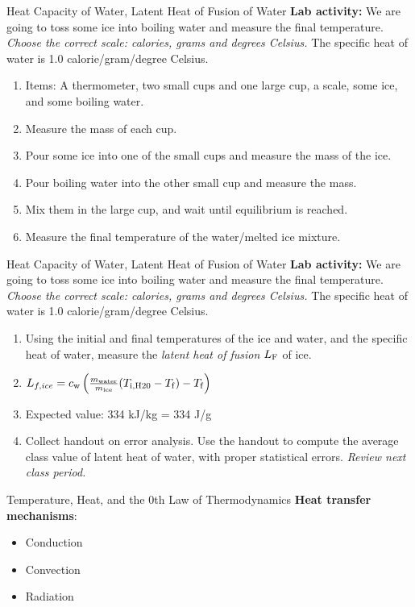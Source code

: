 \documentclass{beamer}
\begin{document}
\begin{frame}{Heat Capacity of Water, Latent Heat of Fusion of Water}
\small
\textbf{Lab activity:} We are going to toss some ice into boiling water and measure the final temperature.  \textit{Choose the correct scale: calories, grams and degrees Celsius.} \alert{The specific heat of water is 1.0 calorie/gram/degree Celsius}.
\begin{enumerate}
\item Items: A thermometer, two small cups and one large cup, a scale, some ice, and some boiling water.
\item Measure the mass of each cup.
\item Pour some ice into one of the small cups and measure the mass of the ice.
\item Pour boiling water into the other small cup and measure the mass.
\item Mix them in the large cup, and wait until equilibrium is reached.
\item Measure the final temperature of the water/melted ice mixture.
\end{enumerate}
\end{frame}

\begin{frame}{Heat Capacity of Water, Latent Heat of Fusion of Water}
\small
\textbf{Lab activity:} We are going to toss some ice into boiling water and measure the final temperature.  \textit{Choose the correct scale: calories, grams and degrees Celsius.} \alert{The specific heat of water is 1.0 calorie/gram/degree Celsius}.
\begin{enumerate}
\item Using the initial and final temperatures of the ice and water, and the specific heat of water, measure the \textit{latent heat of fusion} $L_{\rm F}$ of ice.
\item $L_{f,ice} = c_{\rm w} \left( \frac{m_{\rm water}}{m_{\rm ice}} (T_{\rm i,H20} - T_{\rm f}) - T_{\rm f} \right)$
\item Expected value: 334 kJ/kg = 334 J/g
\item Collect handout on error analysis.  Use the handout to compute the average class value of latent heat of water, with proper statistical errors.  \textit{Review next class period.}
\end{enumerate}
\end{frame}

\begin{frame}{Temperature, Heat, and the 0th Law of Thermodynamics}
\textbf{Heat transfer mechanisms}:
\begin{itemize}
\item Conduction
\item Convection
\item Radiation
\end{itemize}
\end{frame}
\end{document}
